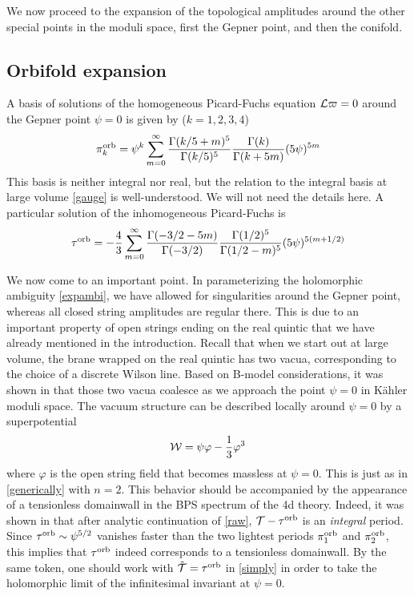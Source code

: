We now proceed to the expansion of the topological amplitudes
around the other special points in the moduli space, first the 
Gepner point, and then the conifold.


\subsection{Orbifold expansion}

A basis of solutions of the homogeneous Picard-Fuchs equation
${\cal L}\varpi=0$ around the Gepner point $\psi=0$ is given by 
($k=1,2,3,4$)
\begin{equation}
\pi^{\rm orb}_k = \psi^k \sum_{m=0}^\infty \frac{\Gamma(k/5+m)^5}{\Gamma(k/5)^5}
\frac{\Gamma(k)}{\Gamma(k+5m)} (5\psi)^{5m}
\end{equation}
This basis is neither integral nor real, but the relation to the integral 
basis at large volume \eqref{gauge} is well-understood. We will not need
the details here. A particular solution of the inhomogeneous Picard-Fuchs 
is
\begin{equation}
\tau^{\rm orb} = -\frac{4}{3}\sum_{m=0}^\infty \frac{\Gamma(-3/2-5m)}{\Gamma(-3/2)}
\frac{\Gamma(1/2)^5}{\Gamma(1/2-m)^5} (5\psi)^{5(m+1/2)}
\end{equation}

We now come to an important point. In parameterizing the holomorphic ambiguity
\eqref{expambi}, we have allowed for singularities around the Gepner point,
whereas all closed string amplitudes are regular there. This is due to an
important property of open strings ending on the real quintic that we have
already mentioned in the introduction. Recall that when we start out at
large volume, the brane wrapped on the real quintic has two vacua,
corresponding to the choice of a discrete Wilson line. Based on B-model
considerations, it was shown in \cite{howa} that those two vacua coalesce 
as we approach the point $\psi=0$ in K\"ahler moduli space. The vacuum 
structure can be described locally around $\psi=0$ by a superpotential 
\cite{bdlr}
\begin{equation}
{\cal W} = \psi\varphi - \frac 13 \varphi^3
\end{equation}
where $\varphi$ is the open string field that becomes massless at $\psi=0$.
This is just as in \eqref{generically} with $n=2$. This behavior should
be accompanied by the appearance of a tensionless domainwall in the
BPS spectrum of the 4d theory. Indeed, it was shown in \cite{open} that
after analytic continuation of \eqref{raw}, ${\cal T}-\tau^{\rm orb}$ is an {\it 
integral} period. Since $\tau^{\rm orb}\sim \psi^{5/2}$ vanishes faster 
than the two lightest periods $\pi^{\rm orb}_1$ and $\pi^{\rm orb}_2$, this implies 
that $\tau^{\rm orb}$ indeed corresponds to a tensionless domainwall. By the same
token, one should work with $\tilde{{\cal T}}=\tau^{\rm orb}$ in \eqref{simply} in order
to take the holomorphic limit of the infinitesimal invariant at
$\psi=0$.

